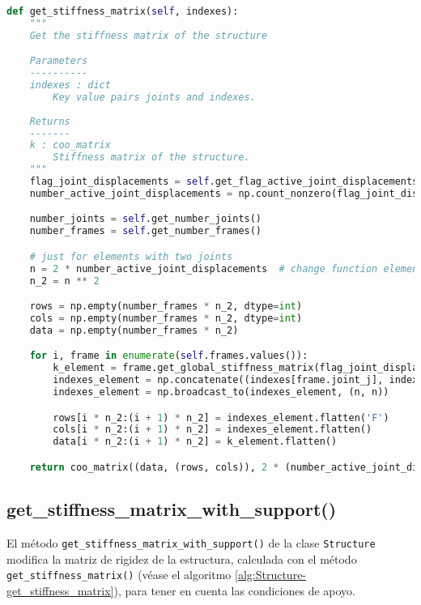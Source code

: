 \begin{lstlisting}[language=Python,caption=Método \texttt{get\_stiffness\_matrix()} de la clase \texttt{Structure}.,label=alg:Structure-get_stiffness_matrix, frame=single]
def get_stiffness_matrix(self, indexes):
    """
    Get the stiffness matrix of the structure

    Parameters
    ----------
    indexes : dict
        Key value pairs joints and indexes.
    
    Returns
    -------
    k : coo_matrix
        Stiffness matrix of the structure.
    """
    flag_joint_displacements = self.get_flag_active_joint_displacements()
    number_active_joint_displacements = np.count_nonzero(flag_joint_displacements)

    number_joints = self.get_number_joints()
    number_frames = self.get_number_frames()

    # just for elements with two joints
    n = 2 * number_active_joint_displacements  # change function element type
    n_2 = n ** 2

    rows = np.empty(number_frames * n_2, dtype=int)
    cols = np.empty(number_frames * n_2, dtype=int)
    data = np.empty(number_frames * n_2)

    for i, frame in enumerate(self.frames.values()):
        k_element = frame.get_global_stiffness_matrix(flag_joint_displacements)
        indexes_element = np.concatenate((indexes[frame.joint_j], indexes[frame.joint_k]))
        indexes_element = np.broadcast_to(indexes_element, (n, n))

        rows[i * n_2:(i + 1) * n_2] = indexes_element.flatten('F')
        cols[i * n_2:(i + 1) * n_2] = indexes_element.flatten()
        data[i * n_2:(i + 1) * n_2] = k_element.flatten()

    return coo_matrix((data, (rows, cols)), 2 * (number_active_joint_displacements * number_joints,))
\end{lstlisting}

\subsection{get\_stiffness\_matrix\_with\_support()}

El método \verb|get_stiffness_matrix_with_support()| de la clase \verb|Structure| modifica la matriz de rigidez de la estructura, calculada con el método \verb|get_stiffness_matrix()| (véase el algoritmo \ref{alg:Structure-get_stiffness_matrix}), para tener en cuenta las condiciones de apoyo.\\


